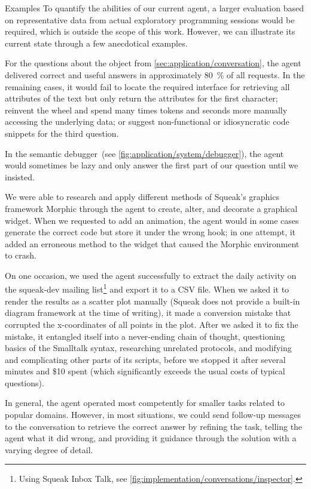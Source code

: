 \begin{genericbox}{Examples}
	To quantify the abilities of our current agent, a larger evaluation based on representative data from actual exploratory programming sessions would be required, which is outside the scope of this work.
	However, we can illustrate its current state through a few anecdotical examples.

	For the questions about the  object from \cref{sec:application/conversation}, the agent delivered correct and useful answers in approximately \qty{80}{\percent} of all requests.
	In the remaining cases, it would fail to locate the required interface for retrieving all attributes of the text but only return the attributes for the first character; reinvent the wheel and spend many times tokens and seconds more manually accessing the underlying data; or suggest non-functional or idiosyncratic code snippets for the third question.

	In the semantic debugger~(see \cref{fig:application/system/debugger}), the agent would sometimes be lazy and only answer the first part of our question until we insisted.

	We were able to research and apply different methods of Squeak's graphics framework Morphic through the agent to create, alter, and decorate a graphical widget.
	When we requested to add an animation, the agent would in some cases generate the correct code but store it under the wrong hook; in one attempt, it added an erroneous method to the widget that caused the Morphic environment to crash.

	On one occasion, we used the agent successfully to extract the daily activity on the squeak-dev mailing list\footnote{Using Squeak Inbox Talk, see \cref{fig:implementation/conversations/inspector}.} and export it to a CSV file.
	When we asked it to render the results as a scatter plot manually (Squeak does not provide a built-in diagram framework at the time of writing), it made a conversion mistake that corrupted the x-coordinates of all points in the plot.
	After we asked it to fix the mistake, it entangled itself into a never-ending chain of thought, questioning basics of the Smalltalk syntax, researching unrelated protocols, and modifying and complicating other parts of its scripts, before we stopped it after several minutes and \$10 spent (which significantly exceeds the usual costs of typical questions).
\end{genericbox}

In general, the agent operated most competently for smaller tasks related to popular domains.
However, in most situations, we could send follow-up messages to the conversation to retrieve the correct answer by refining the task, telling the agent what it did wrong, and providing it guidance through the solution with a varying degree of detail.

